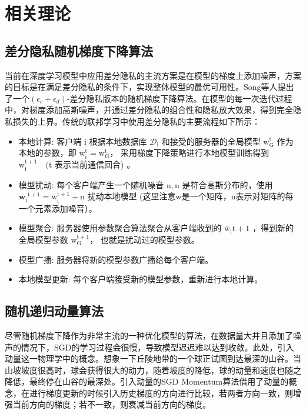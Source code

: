 \section{相关理论}

\subsection{差分隐私随机梯度下降算法}
当前在深度学习模型中应用差分隐私的主流方案是在模型的梯度上添加噪声，方案的目标是在满足差分隐私的条件下，实现整体模型的最优可用性。Song等人提出了一个$\left(\epsilon_{c}+\epsilon_{d}\right)$-差分隐私版本的随机梯度下降算法。在模型的每一次迭代过程中，对梯度添加高斯噪声，并通过差分隐私的组合性和隐私放大效果，得到完全隐私损失的上界。传统的联邦学习中使用差分隐私的主要流程如下所示：
\begin{itemize}
\item 本地计算:
客户端 $\mathrm{i}$ 根据本地数据库 $\mathcal{D}_{\mathrm{i}}$ 和接受的服务器的全局模型 $\mathrm{w}_{\mathrm{G}}^{\mathrm{t}}$ 作为本地的参数，即 $\mathrm{w}_{\mathrm{i}}^{\mathrm{t}}=\mathrm{w}_{\mathrm{G}}^{\mathrm{t}}$， 采用梯度下降策略进行本地模型训练得到 $\mathrm{w}_{\mathrm{i}}^{\mathrm{t}+1} \quad(\mathrm{t}$ 表示当前通信回合) 。

\item 模型扰动:
每个客户端产生一个随机噪音 $\mathrm{n},\mathrm{n}$ 是符合高斯分布的，使用 $\overline{\mathbf{w}_{\mathrm{i}}}^{\mathrm{t}+1}=\mathrm{w}_{\mathrm{i}}^{\mathrm{t}+1}+\mathrm{n}$ 扰动本地模型 (这里注意w是一个矩阵，n表示对矩阵的每一个元素添加噪音）。

\item 模型聚合:
服务器使用参数聚合算法聚合从客户端收到的 $\overline{\mathrm{w}}_{\mathrm{i}} \mathrm{t}+1$ ，得到新的全局模型参数 $\mathrm{w}_{\mathrm{G}}^{\mathrm{t}+1}$， 也就是扰动过的模型参数。

\item 模型广播:
服务器将新的模型参数广播给每个客户端。

\item 本地模型更新:
每个客户端接受新的模型参数，重新进行本地计算。
\end{itemize}

\subsection{随机递归动量算法}
尽管随机梯度下降作为非常主流的一种优化模型的算法，在数据量大并且添加了噪声的情况下，SGD的学习过程会很慢，导致模型迟迟难以达到收敛。此处，引入动量这一物理学中的概念。想象一下丘陵地带的一个球正试图到达最深的山谷。当山坡坡度很高时，球会获得很大的动力，随着坡度的降低，球的动量和速度也随之降低，最终停在山谷的最深处。引入动量的SGD Momentum算法借用了动量的概念，在进行梯度更新的时候引入历史梯度的方向进行比较，若两者方向一致，则增强当前方向的梯度；若不一致，则衰减当前方向的梯度。

